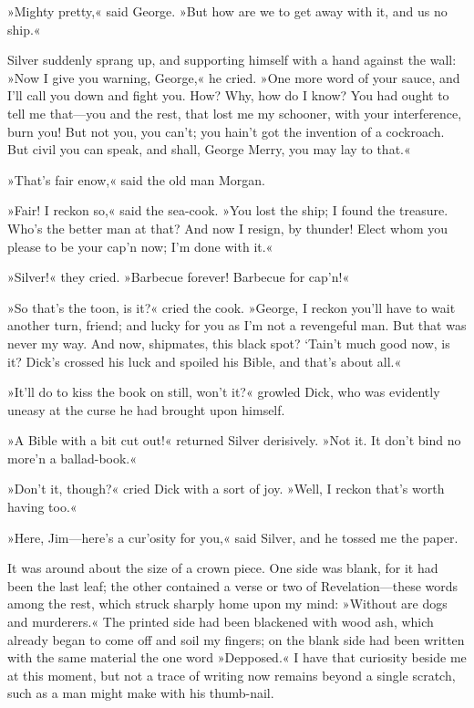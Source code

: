 »Mighty pretty,« said George. »But how are we to get away with it, and us no ship.«

Silver suddenly sprang up, and supporting himself with a hand against the wall: »Now I give you warning, George,« he cried. »One more word of your sauce, and I'll call you down and fight you. How? Why, how do I know? You had ought to tell me that—you and the rest, that lost me my schooner, with your interference, burn you! But not you, you can't; you hain't got the invention of a cockroach. But civil you can speak, and shall, George Merry, you may lay to that.«

»That's fair enow,« said the old man Morgan.

»Fair! I reckon so,« said the sea-cook. »You lost the ship; I found the treasure. Who's the better man at that? And now I resign, by thunder! Elect whom you please to be your cap'n now; I'm done with it.«

»Silver!« they cried. »Barbecue forever! Barbecue for cap'n!«

»So that's the toon, is it?« cried the cook. »George, I reckon you'll have to wait another turn, friend; and lucky for you as I'm not a revengeful man. But that was never my way. And now, shipmates, this black spot? `Tain't much good now, is it? Dick's crossed his luck and spoiled his Bible, and that's about all.«

»It'll do to kiss the book on still, won't it?« growled Dick, who was evidently uneasy at the curse he had brought upon himself.

»A Bible with a bit cut out!« returned Silver derisively. »Not it. It don't bind no more'n a ballad-book.«

»Don't it, though?« cried Dick with a sort of joy. »Well, I reckon that's worth having too.«

»Here, Jim—here's a cur'osity for you,« said Silver, and he tossed me the paper.

It was around about the size of a crown piece. One side was blank, for it had been the last leaf; the other contained a verse or two of Revelation—these words among the rest, which struck sharply home upon my mind: »Without are dogs and murderers.« The printed side had been blackened with wood ash, which already began to come off and soil my fingers; on the blank side had been written with the same material the one word »Depposed.« I have that curiosity beside me at this moment, but not a trace of writing now remains beyond a single scratch, such as a man might make with his thumb-nail.


